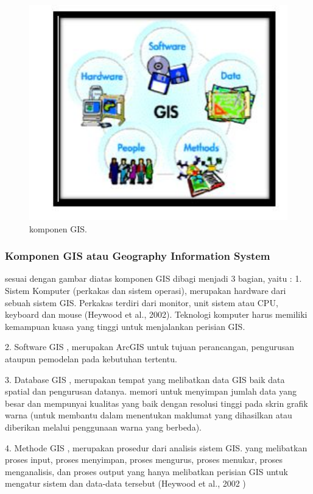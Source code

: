 \begin{figure}[ht]
	\centerline{\includegraphics[width=1\textwidth]{figures/komponenGIS.JPG}}
	\caption{komponen GIS.}
	\label{komponenGIS}
	\end{figure}

\subsubsection{Komponen GIS atau Geography Information System}
sesuai dengan gambar diatas komponen GIS dibagi menjadi 3 bagian, yaitu :
1. Sistem Komputer (perkakas dan sistem operasi), merupakan hardware dari sebuah sistem GIS. Perkakas terdiri dari monitor, unit sistem atau CPU, keyboard dan mouse (Heywood et al., 2002). Teknologi komputer harus memiliki kemampuan kuasa
yang tinggi untuk menjalankan perisian GIS.

2. Software GIS , merupakan ArcGIS untuk tujuan perancangan, pengurusan ataupun pemodelan pada kebutuhan tertentu.

3. Database GIS , merupakan tempat yang melibatkan data GIS baik data spatial dan pengurusan datanya. memori untuk menyimpan jumlah data yang besar dan mempunyai kualitas yang baik dengan resolusi tinggi pada skrin grafik warna (untuk membantu dalam menentukan maklumat yang dihasilkan atau diberikan melalui penggunaan warna yang berbeda).

4. Methode GIS , merupakan prosedur dari analisis sistem GIS. yang melibatkan proses input, proses menyimpan, proses mengurus, proses menukar, proses menganalisis, dan proses output yang hanya melibatkan perisian GIS untuk mengatur sistem dan data-data tersebut (Heywood et al., 2002 )

